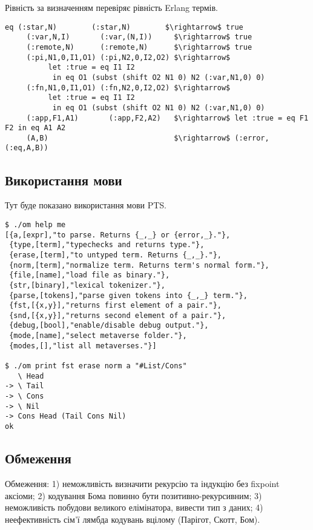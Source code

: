 Рівність за визначенням перевіряє рівність Erlang термів.

\begin{lstlisting}[mathescape=true]
  eq (:star,N)        (:star,N)        $\rightarrow$ true
     (:var,N,I)       (:var,(N,I))     $\rightarrow$ true
     (:remote,N)      (:remote,N)      $\rightarrow$ true
     (:pi,N1,0,I1,O1) (:pi,N2,0,I2,O2) $\rightarrow$
          let :true = eq I1 I2
           in eq O1 (subst (shift O2 N1 0) N2 (:var,N1,0) 0)
     (:fn,N1,0,I1,O1) (:fn,N2,0,I2,O2) $\rightarrow$
          let :true = eq I1 I2
           in eq O1 (subst (shift O2 N1 0) N2 (:var,N1,0) 0)
     (:app,F1,A1)       (:app,F2,A2)   $\rightarrow$ let :true = eq F1 F2 in eq A1 A2
     (A,B)                             $\rightarrow$ (:error,(:eq,A,B))
\end{lstlisting}

\subsection{Використання мови}
Тут буде показано використання мови PTS.

\begin{lstlisting}
$ ./om help me
[{a,[expr],"to parse. Returns {_,_} or {error,_}."},
 {type,[term],"typechecks and returns type."},
 {erase,[term],"to untyped term. Returns {_,_}."},
 {norm,[term],"normalize term. Returns term's normal form."},
 {file,[name],"load file as binary."},
 {str,[binary],"lexical tokenizer."},
 {parse,[tokens],"parse given tokens into {_,_} term."},
 {fst,[{x,y}],"returns first element of a pair."},
 {snd,[{x,y}],"returns second element of a pair."},
 {debug,[bool],"enable/disable debug output."},
 {mode,[name],"select metaverse folder."},
 {modes,[],"list all metaverses."}]

$ ./om print fst erase norm a "#List/Cons"
   \ Head
-> \ Tail
-> \ Cons
-> \ Nil
-> Cons Head (Tail Cons Nil)
ok
\end{lstlisting}

\subsection*{Обмеження}

Обмеження:
1) неможливість визначити рекурсію та індукцію без fixpoint аксіоми;
2) кодування Бома повинно бути позитивно-рекурсивним;
3) неможливість побудови великого елімінатора, вивести тип з даних;
4) неефективність сім'ї лямбда кодувань вцілому (Парігот, Скотт, Бом).

